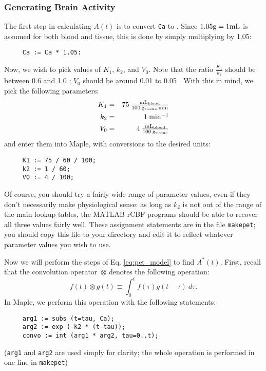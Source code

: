 \subsubsection{Generating Brain Activity}

The first step in calculating $A(t)$ is to convert \verb|Ca| to 
.  Since $1.05 \mbox{$\rm{g}$} = 1
\mbox{$\rm{mL}$}$ is assumed for both blood and tissue, this is done by
simply multiplying by 1.05:
\begin{verbatim}
     Ca := Ca * 1.05:
\end{verbatim}
Now, we wish to pick values of $K_{1}$, $k_{2}$, and $V_{0}$.  Note
that the ratio $\frac{K_{1}}{k_{2}}$ should be between 0.6
and 1.0 ; $V_{0}$ should be around 0.01 to
0.05 .  With this in mind, we pick the
following parameters:
\begin{eqnarray*}
K_{1} &=& 75 \: \mbox{$\rm\frac{mL_{blood}}{100\:g_{tissue}\:{min}}$} \\
k_{2} &=& 1 \: \mbox{$\rm{min^{-1}}$} \\
V_{0} &=& 4 \: \mbox{$\rm\frac{mL_{blood}}{100\:g_{tissue}}$}
\end{eqnarray*}
and enter them into Maple, with conversions to the desired units:
\begin{verbatim}
     K1 := 75 / 60 / 100;
     k2 := 1 / 60;
     V0 := 4 / 100;
\end{verbatim}
Of course, you should try a fairly wide range of parameter values,
even if they don't necessarily make physiological sense: as long as
$k_{2}$ is not out of the range of the main lookup tables, the MATLAB
rCBF programs should be able to recover all three values fairly well.
These assignment statements are in the file \verb|makepet|; you should
copy this file to your directory and edit it to reflect whatever
parameter values you wish to use.

Now we will perform the steps of Eq. \ref{eq:pet_model} to find
$A^{*}(t)$.  First, recall that the convolution operator~$\otimes$
denotes the following operation:
\begin{equation}
f(t) \otimes g(t) \equiv \int_{0}^{t} f(\tau) g(t-\tau) \: d\tau.
\label{eq:convolution} 
\end{equation}
In Maple, we perform this operation with the following statements:
\begin{verbatim}
     arg1 := subs (t=tau, Ca);
     arg2 := exp (-k2 * (t-tau));
     convo := int (arg1 * arg2, tau=0..t);
\end{verbatim}
(\verb|arg1| and \verb|arg2| are used simply for clarity; the whole
operation is performed in one line in \verb|makepet|)

